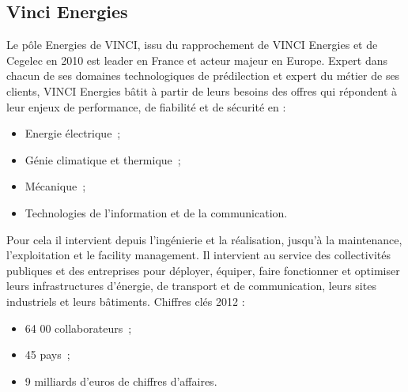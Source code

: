     \subsection{Vinci Energies}
    	Le pôle Energies de VINCI, issu du rapprochement de VINCI Energies et de Cegelec en 2010 est leader en France et acteur majeur en Europe.
    	Expert dans chacun de ses domaines technologiques de prédilection et expert du métier de ses clients, VINCI Energies bâtit à partir de leurs besoins des offres qui répondent à leur enjeux de performance, de fiabilité et de sécurité en :
    \begin{itemize}
    	\item Energie électrique~;
    	\item Génie climatique et thermique~;
    	\item Mécanique~;
    	\item Technologies de l'information et de la communication.
    \end{itemize}
    \bigbreak
    	Pour cela il intervient depuis l'ingénierie et la réalisation, jusqu'à la maintenance, l'exploitation et le facility management. Il intervient au service des collectivités publiques et des entreprises pour déployer, équiper, faire fonctionner et optimiser leurs infrastructures d'énergie, de transport et de communication, leurs sites industriels et leurs bâtiments.
    \newpage
    Chiffres clés 2012 :
    \begin{itemize}
    	\item 64 00 collaborateurs~;
    	\item 45 pays~;
    	\item 9 milliards d'euros de chiffres d'affaires.
    \end{itemize}

